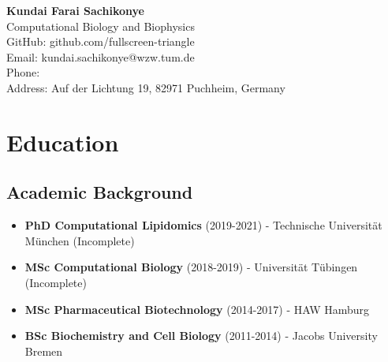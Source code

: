 \documentclass[11pt,a4paper]{article}
\begin{document}
\begin{minipage}[t]{0.65\textwidth}
{\LARGE \textbf{Kundai Farai Sachikonye}}\\[0.3cm]
Computational Biology and Biophysics\\
GitHub: github.com/fullscreen-triangle\\
Email: kundai.sachikonye@wzw.tum.de\\
Phone: \\
Address: Auf der Lichtung 19, 82971 Puchheim, Germany
\end{minipage}
\hfill
\begin{minipage}[t]{0.3\textwidth}
\vspace{-0.5cm}
\end{minipage}

\vspace{0.5cm}

\section{Education}

\subsection{Academic Background}
\begin{itemize}[leftmargin=*,itemsep=0.1em]
\item \textbf{PhD Computational Lipidomics} (2019-2021) - Technische Universität München (Incomplete)
\item \textbf{MSc Computational Biology} (2018-2019) - Universität Tübingen (Incomplete)
\item \textbf{MSc Pharmaceutical Biotechnology} (2014-2017) - HAW Hamburg
\item \textbf{BSc Biochemistry and Cell Biology} (2011-2014) - Jacobs University Bremen
\end{itemize}
\end{document}
